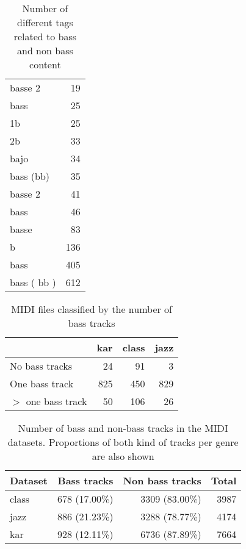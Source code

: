 \documentclass{article}
\begin{document}
\begin{table}
\begin{center}
\begin{tabular}{  l | r }
basse 2 & 19 \\
bass & 25 \\
1b & 25 \\
2b & 33 \\
bajo & 34 \\
bass (bb) & 35 \\
basse 2 & 41 \\
bass & 46 \\
basse & 83 \\
b & 136 \\
bass & 405 \\
bass ( bb ) & 612 \\
\hline
\end{tabular}
\caption{Number of different tags related to bass and non bass content}
\end{center}
\end{table}



\begin{table}
\begin{center}
\begin{tabular}{  l | r | r | r }
\hline
 & kar & class & jazz \\
\hline
\hline
No bass tracks & 24 & 91 & 3 \\
\hline
One bass track & 825 & 450 & 829 \\
\hline
$>$ one bass track & 50 & 106 & 26 \\
\hline
\end{tabular}
\caption{MIDI files classified by the number of bass tracks}
\end{center}
\end{table}


\begin{table}
\begin{center}
\begin{tabular}{  l | r | r | r }
\hline
Dataset & Bass tracks & Non bass tracks & Total \\
\hline
\hline
class & 678 (17.00\%) & 3309 (83.00\%) & 3987 \\
jazz & 886 (21.23\%) & 3288 (78.77\%) & 4174 \\
kar & 928 (12.11\%) & 6736 (87.89\%) & 7664 \\
\hline
\end{tabular}
\caption{Number of bass and non-bass tracks in the MIDI datasets. Proportions of both kind  of tracks per genre are also shown}
\end{center}
\end{table}
\end{document}
